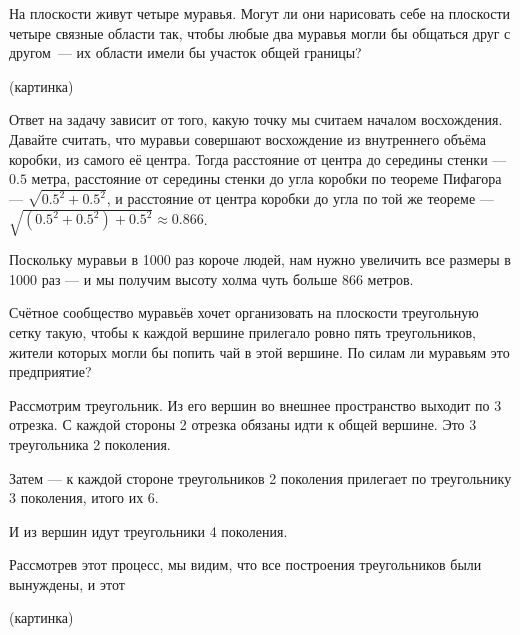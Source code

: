 \begin{itemize}
\itA На плоскости живут четыре муравья. Могут ли они нарисовать себе на плоскости четыре связные 
области так, чтобы любые два муравья могли бы общаться друг с другом~— их области имели бы участок 
общей границы?

(картинка)

\itB Ответ на задачу зависит от того, какую точку мы считаем началом восхождения.
Давайте считать, что муравьи совершают восхождение из внутреннего объёма коробки, из самого её центра.
Тогда расстояние от центра до середины стенки --- $0.5$ метра, расстояние от середины стенки до угла
коробки по теореме Пифагора --- $\sqrt{0.5^2 + 0.5^2}$, и расстояние от центра коробки до угла по той же теореме ---
$\sqrt{(0.5^2 + 0.5^2) + 0.5^2} \approx 0.866$.

Поскольку муравьи в 1000 раз короче людей, нам нужно увеличить все размеры в 1000 раз --- и мы получим высоту холма чуть больше 866 метров.

\itC Счётное сообщество муравьёв хочет организовать на плоскости треугольную сетку такую, чтобы 
к каждой вершине прилегало ровно пять треугольников, жители которых могли бы попить чай в этой 
вершине. По силам ли муравьям это предприятие?

Рассмотрим треугольник. Из его вершин во внешнее пространство выходит по 3 отрезка. С каждой стороны 2 отрезка
обязаны идти к общей вершине. Это 3 треугольника 2 поколения.

Затем --- к каждой стороне треугольников 2 поколения прилегает по треугольнику 3 поколения, итого их 6.

И из вершин идут треугольники 4 поколения. 

Рассмотрев этот процесс, мы видим, что все построения треугольников были вынуждены, и этот

(картинка)

\end{itemize}